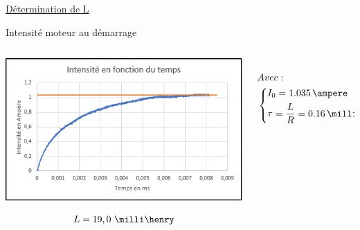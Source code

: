 \documentclass[french, handout]{beamer}
\begin{document}
            \begin{frame}{\hyperlink{pres_moteur}{Détermination de L}}
                \begin{block}{Intensité moteur au démarrage}
                    \begin{columns}[c]
                    
                        \begin{column}{5 cm}
                            \includegraphics[width=6 cm, height = 3.5 cm]{courant-temps_deter_L.png}
                            \vspace{0.1cm}
                            \begin{tcolorbox}[text width = 4.9cm, colback=green!5!white, colframe=green!75!black, title=Résultat]
                                \[L=19,0~ \milli\henry\]
                            \end{tcolorbox}
                        \end{column}
                    
                        \begin{column}{4.5 cm}
                            \begin{tcolorbox}[text height = 4.2 cm, colback=red!5!white, colframe=red!75!black, title=Equation]
                               \begin{center}
                                    ~\\ $\begin{aligned} &Avec : \\&\left\{
                                    \begin{aligned}
                                    &I_{0}=1.035 \, \ampere\\
                                    &\tau=\frac{L}{R}=0.16 \, \milli\second
                                    \end{aligned}
                                    \right.\end{aligned} $ 
                               \end{center} 
                            \end{tcolorbox}
                        \end{column}
                    \end{columns}
                \end{block}   
            \end{frame}
\end{document}

